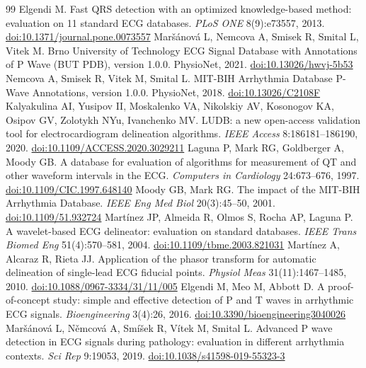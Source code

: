\documentclass[11pt,a4paper]{article}
\begin{document}
\begin{thebibliography}{99}
\small
{} Elgendi M. Fast QRS detection with an optimized knowledge-based method: evaluation on 11 standard ECG databases. \emph{PLoS ONE} 8(9):e73557, 2013. \href{https://doi.org/10.1371/journal.pone.0073557}{doi:10.1371/journal.pone.0073557}
 Maršánová L, Nemcova A, Smisek R, Smital L, Vitek M. Brno University of Technology ECG Signal Database with Annotations of P Wave (BUT PDB), version 1.0.0. PhysioNet, 2021. \href{https://doi.org/10.13026/hwvj-5b53}{doi:10.13026/hwvj-5b53}
 Nemcova A, Smisek R, Vitek M, Smital L. MIT-BIH Arrhythmia Database P-Wave Annotations, version 1.0.0. PhysioNet, 2018. \href{https://doi.org/10.13026/C2108F}{doi:10.13026/C2108F}
 Kalyakulina AI, Yusipov II, Moskalenko VA, Nikolskiy AV, Kosonogov KA, Osipov GV, Zolotykh NYu, Ivanchenko MV. LUDB: a new open-access validation tool for electrocardiogram delineation algorithms. \emph{IEEE Access} 8:186181--186190, 2020. \href{https://doi.org/10.1109/ACCESS.2020.3029211}{doi:10.1109/ACCESS.2020.3029211}
 Laguna P, Mark RG, Goldberger A, Moody GB. A database for evaluation of algorithms for measurement of QT and other waveform intervals in the ECG. \emph{Computers in Cardiology} 24:673--676, 1997. \href{https://doi.org/10.1109/CIC.1997.648140}{doi:10.1109/CIC.1997.648140}
 Moody GB, Mark RG. The impact of the MIT-BIH Arrhythmia Database. \emph{IEEE Eng Med Biol} 20(3):45--50, 2001. \href{https://doi.org/10.1109/51.932724}{doi:10.1109/51.932724}
 Martínez JP, Almeida R, Olmos S, Rocha AP, Laguna P. A wavelet-based ECG delineator: evaluation on standard databases. \emph{IEEE Trans Biomed Eng} 51(4):570--581, 2004. \href{https://doi.org/10.1109/tbme.2003.821031}{doi:10.1109/tbme.2003.821031}
 Martínez A, Alcaraz R, Rieta JJ. Application of the phasor transform for automatic delineation of single-lead ECG fiducial points. \emph{Physiol Meas} 31(11):1467--1485, 2010. \href{https://doi.org/10.1088/0967-3334/31/11/005}{doi:10.1088/0967-3334/31/11/005}
 Elgendi M, Meo M, Abbott D. A proof-of-concept study: simple and effective detection of P and T waves in arrhythmic ECG signals. \emph{Bioengineering} 3(4):26, 2016. \href{https://doi.org/10.3390/bioengineering3040026}{doi:10.3390/bioengineering3040026}
 Maršánová L, Němcová A, Smíšek R, Vítek M, Smital L. Advanced P wave detection in ECG signals during pathology: evaluation in different arrhythmia contexts. \emph{Sci Rep} 9:19053, 2019. \href{https://doi.org/10.1038/s41598-019-55323-3}{doi:10.1038/s41598-019-55323-3}

\end{thebibliography}
\end{document}
